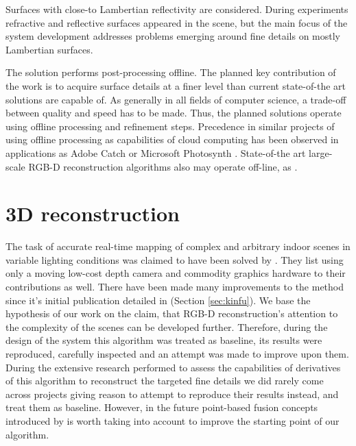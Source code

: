 \documentclass{ucl_thesis}
\newcommand{\secref}[1]{(Section \ref{#1})}
\begin{document}
\par Surfaces with close-to Lambertian reflectivity are considered. During experiments refractive and reflective surfaces appeared in the scene, but the main focus of the system development addresses problems emerging around fine details on mostly Lambertian surfaces. \\

\par The solution performs post-processing offline. The planned key contribution of the work is to acquire surface details at a finer level than current state-of-the art solutions are capable of. As generally in all fields of computer science, a trade-off between quality and speed has to be made. Thus, the planned solutions operate using offline processing and refinement steps. Precedence in similar projects of using offline processing as capabilities of cloud computing has been observed in applications as Adobe Catch \citep{AdobeCatch} or Microsoft Photosynth \citep{Photosynth}. State-of-the art large-scale RGB-D reconstruction algorithms also may operate off-line, as \citep{Zhou:2013}. \\

\section{3D reconstruction}

The task of accurate real-time mapping of complex and
arbitrary indoor scenes in variable lighting conditions was claimed to have been solved by \citep{Newcombe11}. They list using only a
moving low-cost depth camera and commodity graphics hardware to their contributions as well. There have been made many improvements to the method since it's initial publication detailed in \secref{sec:kinfu}. We base the hypothesis of our work on the claim, that RGB-D reconstruction's attention to the complexity of the scenes can be developed further. Therefore, during the design of the system this algorithm was treated as baseline, its results were reproduced, carefully inspected and an attempt was made to improve upon them. During the extensive research performed to assess the capabilities of derivatives of this algorithm to reconstruct the targeted fine details we did rarely come across projects giving reason to attempt to reproduce their results instead, and treat them as baseline. However, in the future point-based fusion concepts introduced by \citep{keller13realtime} is worth taking into account to improve the starting point of our algorithm.
\end{document}
